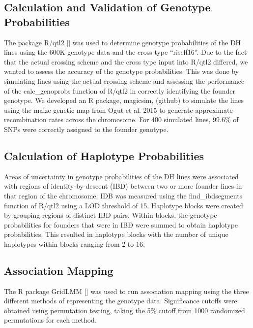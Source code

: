 \documentclass[9pt,twocolumn,twoside]{rilabRxiv}
\begin{document}
\subsection{Calculation and Validation of Genotype Probabilities}
The package R/qtl2 [] was used to determine genotype probabilities of the DH lines using the 600K genotype data and the cross type ``riself16''. Due to the fact that the actual crossing scheme and the cross type input into R/qtl2 differed, we wanted to assess the accuracy of the genotype probabilities. This was done by simulating lines using the actual crossing scheme and assessing the performance of the calc\_genoprobs function of R/qtl2 in correctly identifying the founder genotype. We developed an R package, magicsim, (github) to simulate the lines using the maize genetic map from Ogut et al. 2015 to generate approximate recombination rates across the chromosome. For 400 simulated lines, 99.6\% of SNPs were correctly assigned to the founder genotype.
\subsection{Calculation of Haplotype Probabilities}
Areas of uncertainty in genotype probabilities of the DH lines were associated with regions of identity-by-descent (IBD) between two or more founder lines in that region of the chromosome. IDB was measured using the find\_ibdsegments function of R/qtl2 using a LOD threshold of 15. Haplotype blocks were created by grouping regions of distinct IBD pairs. Within blocks, the genotype probabilities for founders that were in IBD were summed to obtain haplotype probabilities. This resulted in haplotype blocks with the number of unique haplotypes within blocks ranging from 2 to 16.
\subsection{Association Mapping}
The R package GridLMM [] was used to run association mapping using the three different methods of representing the genotype data. 
Significance cutoffs were obtained using permutation testing, taking the 5\% cutoff from 1000 randomized permutations for each method. 
\end{document}
